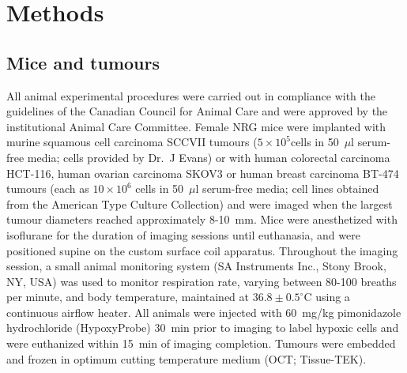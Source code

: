 \section{Methods}
\subsection{Mice and tumours}

All animal experimental procedures were carried out in compliance with the guidelines of the Canadian Council for Animal Care and were approved by the institutional Animal Care Committee. 
Female NRG mice were implanted with murine squamous cell carcinoma SCCVII tumours ($5 \times 10^5 $cells in 50~$\mu$l serum-free media; cells provided by Dr.\ J Evans) or with human colorectal carcinoma HCT-116, human ovarian carcinoma SKOV3 or human breast carcinoma BT-474 tumours (each as $10 \times 10^6$ cells in 50~$\mu$l serum-free media; cell lines obtained from the American Type Culture Collection) and were imaged when the largest tumour diameters reached approximately 8-10~mm.
Mice were anesthetized with isoflurane for the duration of imaging sessions until euthanasia, and were positioned supine on the custom surface coil apparatus.
Throughout the imaging session, a small animal monitoring system (SA Instruments Inc., Stony Brook, NY, USA) was used to monitor respiration rate, varying between 80-100 breaths per minute, and body temperature, maintained at $36.8 \pm 0.5^\circ$C using a continuous airflow heater.
All animals were injected with 60~mg/kg pimonidazole hydrochloride (HypoxyProbe) 30~min prior to imaging to label hypoxic cells and were euthanized within 15~min of imaging completion.
Tumours were embedded and frozen in optimum cutting temperature medium (OCT; Tissue-TEK).

